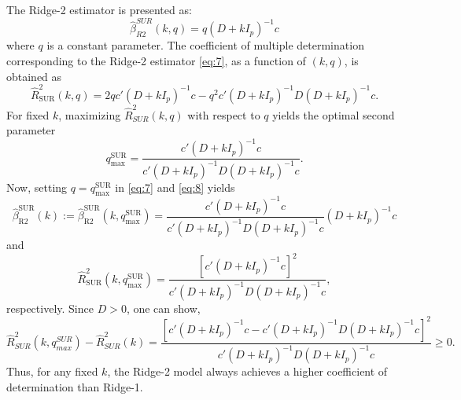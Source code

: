 \documentclass[twoside]{article}
\begin{document}
The Ridge-2 estimator is presented as:
\begin{equation}
\hat{\beta}_{R2}^{SUR}(k,q) = q(D + kI_p)^{-1}c \label{eq:7}
\end{equation}
where $q$ is a constant parameter. The coefficient of multiple determination corresponding to the Ridge-2 estimator \eqref{eq:7}, as a function of $(k, q)$, is obtained as
\begin{equation}
\hat{R}^{2}_{\text{SUR}}(k, q) = 2q c'(D + kI_p)^{-1}c - q^2 c'(D + kI_p)^{-1}D(D + kI_p)^{-1}c.
\label{eq:8}
\end{equation}
For fixed $k$, maximizing $\hat{R}^{2}_{SUR}(k, q)$ with respect to $q$ yields the optimal second parameter 
\begin{equation}
q^{\text{SUR}}_{\text{max}} = \frac{c'(D + kI_p)^{-1}c}{c'(D + kI_p)^{-1}D(D + kI_p)^{-1}c}.
\label{eq:qmax}
\end{equation}
Now, setting $q = q^{\text{SUR}}_{\text{max}}$ in \eqref{eq:7} and \eqref{eq:8} yields
\begin{equation}
\hat{\beta}^{\text{SUR}}_{\text{R2}}(k) := \hat{\beta}^{\text{SUR}}_{\text{R2}}(k, q^{\text{SUR}}_{\text{max}}) = \frac{c'(D + kI_p)^{-1}c}{c'(D + kI_p)^{-1}D(D + kI_p)^{-1}c} (D + kI_p)^{-1}c
\label{eq:betaR2}
\end{equation}
and
\begin{equation}
\hat{R}^{2}_{\text{SUR}}(k, q^{\text{SUR}}_{\text{max}}) = \frac{\left[c'(D + kI_p)^{-1}c\right]^{2}}{c'(D + kI_p)^{-1}D(D + kI_p)^{-1}c},
\label{eq:9}
\end{equation}
respectively. Since $D > 0$, one can show,
\begin{equation*}
\hat{R}^{2}_{SUR}(k, q^{SUR}_{max}) - \hat{R}^{2}_{SUR}(k) = \frac{[c'(D + kI_p)^{-1}c - c'(D + kI_p)^{-1}D(D + kI_p)^{-1}c]^{2}}{c'(D + kI_p)^{-1}D(D + kI_p)^{-1}c} \geq 0.
\end{equation*}
Thus, for any fixed $k$, the Ridge-2 model always achieves a higher coefficient of determination than Ridge-1.
\end{document}
